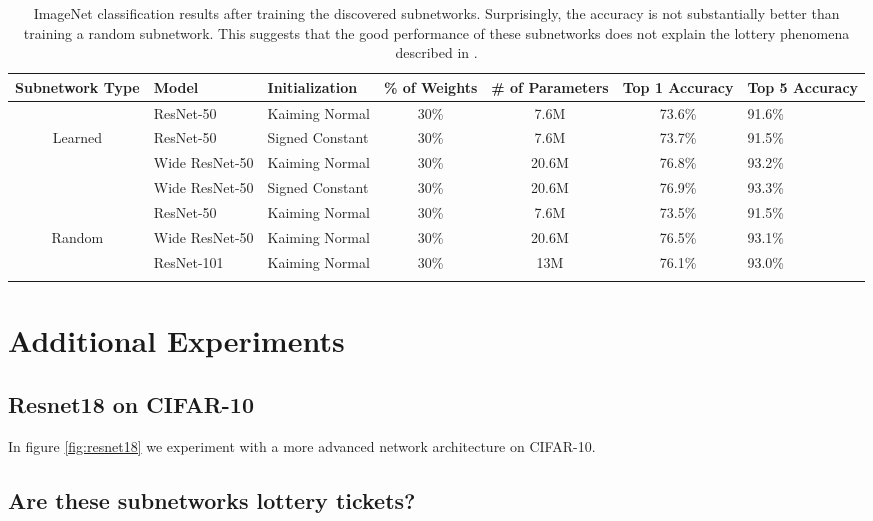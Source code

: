 \documentclass[10pt,twocolumn,letterpaper]{article}
\begin{document}
\begin{table*}[ht!]
  \small
  \centering
  \begin{tabular}{cllcccl}
    \toprule
    Subnetwork Type & Model & Initialization & \% of Weights & \# of Parameters & Top 1 Accuracy & Top 5 Accuracy\\
    \midrule
            & ResNet-50 \cite{resnet}& Kaiming Normal & 30\% & 7.6M & 73.6\% & 91.6\%\\
    Learned & ResNet-50 \cite{resnet}& Signed Constant & 30\% & 7.6M & 73.7\% & 91.5\%\\
            & Wide ResNet-50 \cite{wideresnet}& Kaiming Normal & 30\% & 20.6M & 76.8\% & 93.2\%\\
            & Wide ResNet-50 \cite{wideresnet}& Signed Constant & 30\% & 20.6M & 76.9\% & 93.3\%\\
            \midrule
            & ResNet-50 \cite{resnet}& Kaiming Normal & 30\% & 7.6M & 73.5\% & 91.5\%\\
    Random  & Wide ResNet-50 \cite{wideresnet} & Kaiming Normal & 30\% & 20.6M & 76.5\% & 93.1\%\\
            & ResNet-101 \cite{resnet} & Kaiming Normal & 30\% & 13M & 76.1\% & 93.0\%\\
    \bottomrule
        \\
    \end{tabular}
    \caption{ImageNet \cite{imagenet} classification results after training the discovered subnetworks. Surprisingly, the
    accuracy is not substantially better than training a random subnetwork. This suggests that the good performance of these subnetworks does not explain the lottery phenomena described in \cite{lth}.}
\label{tab:lottery}
\end{table*} 


\section{Additional Experiments}

\subsection{Resnet18 on CIFAR-10}

In figure \ref{fig:resnet18} we experiment with a more advanced network architecture on CIFAR-10. 

\subsection{Are these subnetworks lottery tickets?}
\end{document}
